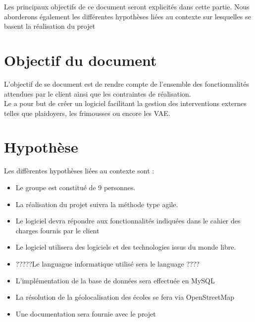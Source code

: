 	Les principaux objectifs de ce document seront explicités dans cette partie. Nous aborderons également les différentes hypothèses liées au contexte sur lesquelles se basent la réalisation du projet


\section{Objectif du document}
	L'objectif de se document est de rendre compte de l'ensemble des fonctionnalités attendues par le client ainsi que les contraintes de réalisation. \\
	
	Le \PICCourt{} \nomClient a pour but de créer un logiciel facilitant la gestion des interventions externes telles que plaidoyers, les frimousses ou encore les VAE.
	
	
\section{Hypothèse}
	Les diffèrentes hypothèses liées au contexte sont :
	\begin{itemize}
		\item Le groupe \nomEquipe{} est constitué de 9 personnes.
		\item La réalisation du projet suivra la méthode type agile.
		\item Le logiciel devra répondre aux fonctionnalités indiquées dans le cahier des charges fournis par le client
		\item Le logiciel utilisera des logiciels et des technologies issus du monde libre.
		\item  ?????Le languague informatique utilisé sera le language ????
		\item L'implémentation de la base de données sera effectuée en MySQL
		\item La résolution de la géolocalisation des écoles se fera via OpenStreetMap 
		\item Une documentation sera fournie avec le projet
	\end{itemize}
	